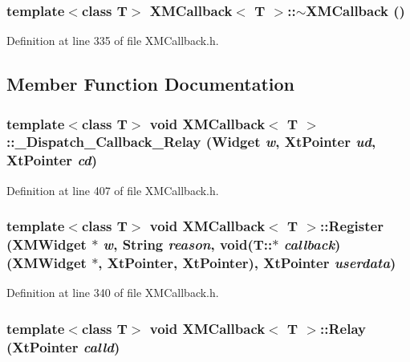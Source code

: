 \subsubsection{\setlength{\rightskip}{0pt plus 5cm}template$<$class T$>$ XMCallback$<$ T $>$::$\sim$XMCallback ()\hspace{0.3cm}{\tt  [inline]}}\label{classXMCallback_a2}




Definition at line 335 of file XMCallback.h.

\subsection{Member Function Documentation}
\subsubsection{\setlength{\rightskip}{0pt plus 5cm}template$<$class T$>$ void XMCallback$<$ T $>$::\_\-Dispatch\_\-Callback\_\-Relay (Widget {\em w}, Xt\-Pointer {\em ud}, Xt\-Pointer {\em cd})\hspace{0.3cm}{\tt  [inline, static, private]}}\label{classXMCallback_f0}




Definition at line 407 of file XMCallback.h.
\subsubsection{\setlength{\rightskip}{0pt plus 5cm}template$<$class T$>$ void XMCallback$<$ T $>$::Register ({\bf XMWidget} $\ast$ {\em w}, String {\em reason}, void(T::$\ast$ {\em callback})({\bf XMWidget} $\ast$, Xt\-Pointer, Xt\-Pointer), Xt\-Pointer {\em userdata})\hspace{0.3cm}{\tt  [inline]}}\label{classXMCallback_a3}




Definition at line 340 of file XMCallback.h.
\subsubsection{\setlength{\rightskip}{0pt plus 5cm}template$<$class T$>$ void XMCallback$<$ T $>$::Relay (Xt\-Pointer {\em calld})\hspace{0.3cm}{\tt  [inline]}}\label{classXMCallback_a5}





